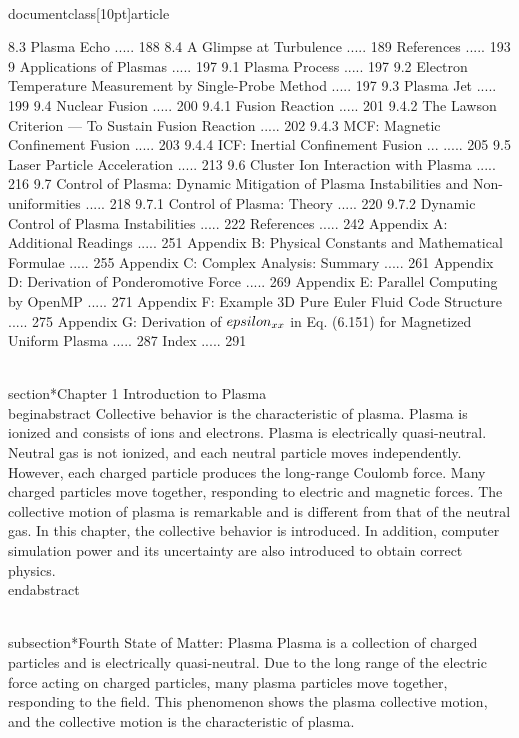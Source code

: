 \\documentclass[10pt]{article}
\begin{document}
8.3 Plasma Echo ..... 188
8.4 A Glimpse at Turbulence ..... 189
References ..... 193
9 Applications of Plasmas ..... 197
9.1 Plasma Process ..... 197
9.2 Electron Temperature Measurement by Single-Probe Method ..... 197
9.3 Plasma Jet ..... 199
9.4 Nuclear Fusion ..... 200
9.4.1 Fusion Reaction ..... 201
9.4.2 The Lawson Criterion — To Sustain Fusion Reaction ..... 202
9.4.3 MCF: Magnetic Confinement Fusion ..... 203
9.4.4 ICF: Inertial Confinement Fusion ... ..... 205
9.5 Laser Particle Acceleration ..... 213
9.6 Cluster Ion Interaction with Plasma ..... 216
9.7 Control of Plasma: Dynamic Mitigation of Plasma Instabilities and Non-uniformities ..... 218
9.7.1 Control of Plasma: Theory ..... 220
9.7.2 Dynamic Control of Plasma Instabilities ..... 222
References ..... 242
Appendix A: Additional Readings ..... 251
Appendix B: Physical Constants and Mathematical Formulae ..... 255
Appendix C: Complex Analysis: Summary ..... 261
Appendix D: Derivation of Ponderomotive Force ..... 269
Appendix E: Parallel Computing by OpenMP ..... 271
Appendix F: Example 3D Pure Euler Fluid Code Structure ..... 275
Appendix G: Derivation of $\\epsilon_{x x}$ in Eq. (6.151) for Magnetized Uniform Plasma ..... 287
Index ..... 291

\\section*{Chapter 1 Introduction to Plasma }
\\begin{abstract}
Collective behavior is the characteristic of plasma. Plasma is ionized and consists of ions and electrons. Plasma is electrically quasi-neutral. Neutral gas is not ionized, and each neutral particle moves independently. However, each charged particle produces the long-range Coulomb force. Many charged particles move together, responding to electric and magnetic forces. The collective motion of plasma is remarkable and is different from that of the neutral gas. In this chapter, the collective behavior is introduced. In addition, computer simulation power and its uncertainty are also introduced to obtain correct physics.
\\end{abstract}

\\subsection*{Fourth State of Matter: Plasma}
Plasma is a collection of charged particles and is electrically quasi-neutral. Due to the long range of the electric force acting on charged particles, many plasma particles move together, responding to the field. This phenomenon shows the plasma collective motion, and the collective motion is the characteristic of plasma.
\end{document}
